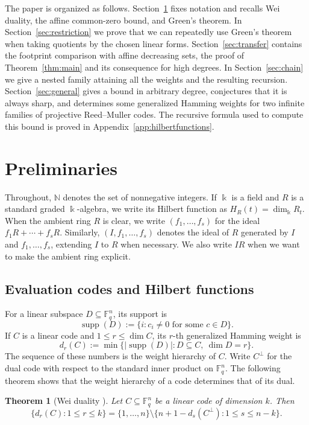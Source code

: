 \documentclass[11pt]{amsart}
\newtheorem{theorem}{Theorem}[section]
\theoremstyle{definition}
\newcommand{\F}{\mathbb F}
\newcommand{\N}{\mathbb N}
\newcommand{\supp}{\operatorname{supp}}
\newcommand{\card}[1]{\left|#1\right|}
\numberwithin{equation}{section}
\begin{document}
The paper is organized as follows. Section~\ref{sec:prelim} fixes
notation and recalls Wei duality, the affine common-zero bound, and Green's theorem.
In Section~\ref{sec:restriction} we prove that we can repeatedly use Green's theorem when taking quotients by the chosen linear forms. Section~\ref{sec:transfer} contains the footprint
comparison with affine decreasing sets, the proof of Theorem~\ref{thm:main}
and its consequence for high degrees.
In Section~\ref{sec:chain} we give a nested
family attaining all the weights and the resulting recursion.
Section~\ref{sec:general} gives a bound in arbitrary
degree, conjectures that it is always sharp, and determines
some generalized Hamming weights for two infinite families of
projective Reed--Muller codes.
The recursive formula used to compute this bound is proved
in Appendix~\ref{app:hilbertfunctions}.



\section{Preliminaries}\label{sec:prelim}

Throughout, $\N$ denotes the set of nonnegative integers. If $\Bbbk$ is a
field and $R$ is a standard graded $\Bbbk$-algebra, we write its Hilbert function as
$H_R(t)=\dim_{\Bbbk} R_t$. When the ambient ring $R$ is clear, we write
$(f_1,\ldots,f_s)$ for the ideal
$f_1R+\cdots+f_sR$. Similarly, $(I,f_1,\ldots,f_s)$
denotes the ideal of $R$ generated by $I$ and
$f_1,\ldots,f_s$, extending $I$ to $R$ when necessary. We also write $IR$ when we want to make the ambient ring explicit.

\subsection{Evaluation codes and Hilbert functions}

For a linear subspace $D\subseteq\F_q^n$, its support is
\[
 \supp(D):=\{i: c_i\ne0\text{ for some }c\in D\}.
\]
If $C$ is a linear code and $1\le r\le\dim C$, its $r$-th generalized
Hamming weight is
\[
 d_r(C):=\min\{\card{\supp(D)}:D\subseteq C,\ \dim D=r\}.
\]
The sequence of these numbers is the weight hierarchy of $C$.
Write $C^\perp$ for the dual code with respect to the standard inner
product on $\F_q^n$. The following theorem shows that the weight
hierarchy of a code determines that of its dual.

\begin{theorem}[Wei duality {\cite[Thm.~3]{Wei}}]\label{thm:weiduality}
Let $C\subseteq\F_q^n$ be a linear code of dimension $k$. Then
\[
 \{d_r(C):1\le r\le k\}
 =\{1,\ldots,n\}\setminus
   \{n+1-d_s(C^\perp):1\le s\le n-k\}.
\]
\end{theorem}
\end{document}
